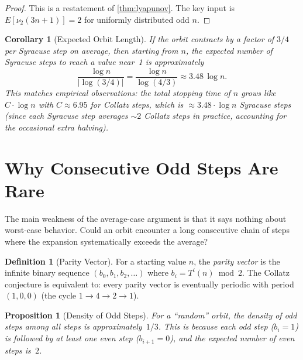 \documentclass[11pt,a4paper]{article}
\newtheorem{proposition}[theorem]{Proposition}
\newtheorem{corollary}[theorem]{Corollary}
\theoremstyle{definition}
\newtheorem{definition}[theorem]{Definition}
\begin{document}
\begin{proof}
This is a restatement of \cref{thm:lyapunov}. The key input is
$E[\nu_2(3n+1)] = 2$ for uniformly distributed odd $n$.
\end{proof}

\begin{corollary}[Expected Orbit Length]\label{cor:orbit-length}
If the orbit contracts by a factor of $3/4$ per Syracuse step on average, then
starting from $n$, the expected number of Syracuse steps to reach a value near~1
is approximately
\[
  \frac{\log n}{|\log(3/4)|} = \frac{\log n}{\log(4/3)} \approx 3.48\,\log n.
\]
This matches empirical observations: the total stopping time of $n$ grows like
$C \cdot \log n$ with $C \approx 6.95$ for Collatz steps, which is
$\approx 3.48 \cdot \log n$ Syracuse steps (since each Syracuse step averages
$\sim 2$ Collatz steps in practice, accounting for the occasional extra halving).
\end{corollary}

\section{Why Consecutive Odd Steps Are Rare}\label{sec:consecutive}

The main weakness of the average-case argument is that it says nothing about
worst-case behavior. Could an orbit encounter a long consecutive chain of
steps where the expansion systematically exceeds the average?

\begin{definition}[Parity Vector]
For a starting value $n$, the \emph{parity vector} is the infinite binary
sequence $(b_0, b_1, b_2, \ldots)$ where $b_i = T^i(n) \bmod 2$. The
Collatz conjecture is equivalent to: every parity vector is eventually periodic
with period $(1, 0, 0)$ (the cycle $1 \to 4 \to 2 \to 1$).
\end{definition}

\begin{proposition}[Density of Odd Steps]\label{prop:density}
For a ``random'' orbit, the density of odd steps among all steps is
approximately~$1/3$. This is because each odd step ($b_i = 1$) is followed by
at least one even step ($b_{i+1} = 0$), and the expected number of even steps
is~$2$.
\end{proposition}
\end{document}
